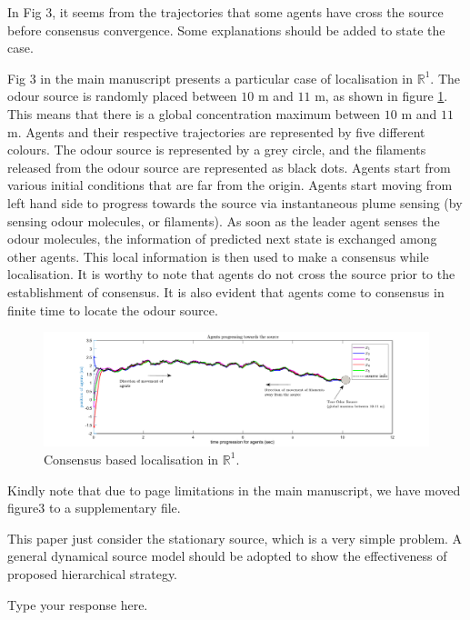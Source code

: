 \documentclass[10pt]{article}
\begin{document}
\begin{response}{In Fig 3, it seems from the trajectories that some agents have cross the source before consensus convergence. Some explanations should be added to state the case.}

Fig 3 in the main manuscript presents a particular case of localisation in $\mathbb{R}^1$. The odour source is randomly placed between $10$ m and $11$ m, as shown in figure \ref{fig:xi}. This means that there is a global concentration maximum between $10$ m and $11$ m. Agents and their respective trajectories are represented by five different colours. The odour source is represented by a grey circle, and the filaments released from the odour source are represented as black dots. Agents start from various initial conditions that are far from the origin. Agents start moving from left hand side to progress towards the source via instantaneous plume sensing (by sensing odour molecules, or filaments). As soon as the leader agent senses the odour molecules, the information of predicted next state is exchanged among other agents. This local information is then used to make a consensus while localisation. It is worthy to note that agents do not cross the source prior to the establishment of consensus. It is also evident that agents come to consensus in finite time to locate the odour source.
\begin{figure}[h!]
\includegraphics[width=\textwidth]{xiR1.pdf}
\caption{Consensus based localisation in $\mathbb{R}^1$.}\label{fig:xi}
\end{figure}

Kindly note that due to page limitations in the main manuscript, we have moved figure3 to a supplementary file.
\end{response}

\begin{response}{This paper just consider the stationary source, which is a very simple problem. A general dynamical source model should be adopted to show the effectiveness of proposed hierarchical strategy.}

Type your response here.

\end{response}
\end{document}
